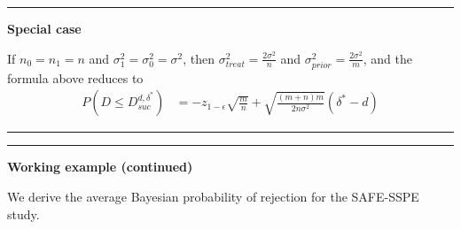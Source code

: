 \documentclass[
]{book}
\begin{document}
\begin{center}\rule{0.5\linewidth}{0.5pt}\end{center}

\textbf{Special case}

If \(n_0=n_1=n\) and \(\sigma_1^2=\sigma_0^2=\sigma^2\), then \(\sigma_{treat}^2=\frac{2\sigma^2}{n}\) and \(\sigma_{prior}^2=\frac{2\sigma^2}{m}\), and the formula above reduces to
\[
\begin{aligned}
P(D\leq D_{suc}^{d,\delta^*})&=-z_{1-\epsilon}\sqrt{\frac{m}{n}}+\sqrt{\frac{(m+n)m}{2n\sigma^2}}(\delta^*-d)
\end{aligned}
\]

\begin{center}\rule{0.5\linewidth}{0.5pt}\end{center}

\begin{center}\rule{0.5\linewidth}{0.5pt}\end{center}

\textbf{Working example (continued) }

We derive the average Bayesian probability of rejection for the SAFE-SSPE study.
\end{document}
